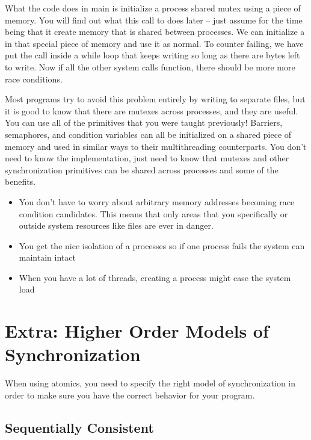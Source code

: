 What the code does in main is initialize a process shared mutex using a piece of  memory. You will find out what this call to  does later -- just assume for the time being that it create memory that is shared between processes. We can initialize a  in that special piece of memory and use it as normal. To counter  failing, we have put the  call inside a while loop that keeps writing so long as there are bytes left to write. Now if all the other system calls function, there should be more more race conditions.

Most programs try to avoid this problem entirely by writing to separate files, but it is good to know that there are mutexes across processes, and they are useful. You can use all of the primitives that you were taught previously! Barriers, semaphores, and condition variables can all be initialized on a shared piece of memory and used in similar ways to their multithreading counterparts. You don't need to know the implementation, just need to know that mutexes and other synchronization primitives can be shared across processes and some of the benefits.

\begin{itemize}
\tightlist
\item
  You don't have to worry about arbitrary memory addresses becoming race condition candidates. This means that only areas that you specifically  or outside system resources like files are ever in danger.
\item
  You get the nice isolation of a processes so if one process fails the system can maintain intact
\item
  When you have a lot of threads, creating a process might ease the system load
\end{itemize}

\section{Extra: Higher Order Models of Synchronization}

When using atomics, you need to specify the right model of synchronization in order to make sure you have the correct behavior for your program.

\subsection{Sequentially Consistent}

